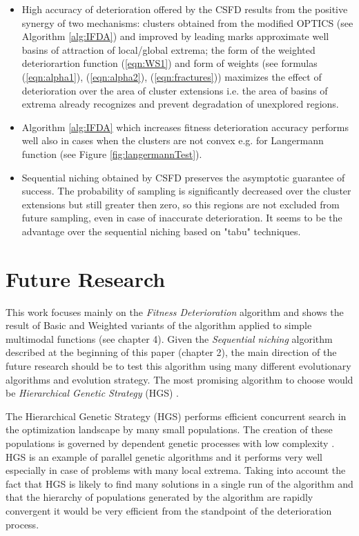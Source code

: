 \begin{itemize}
\item
High accuracy of deterioration offered by the CSFD results from
the positive synergy of two mechanisms:
clusters obtained from the modified OPTICS (see Algorithm \ref{alg:IFDA})
and improved by leading marks
approximate well basins of attraction of local/global extrema;
the form of the weighted deteriorartion function (\ref{eqn:WS1})
and form of weights (see formulas (\ref{eqn:alpha1}), (\ref{eqn:alpha2}), 
(\ref{eqn:fractures})) maximizes the effect of deterioration over the area of
cluster extensions i.e. the area of basins of extrema already recognizes
and prevent degradation of unexplored regions.



\item
Algorithm \ref{alg:IFDA} which increases 
fitness deterioration accuracy performs well also in cases when 
the clusters are not convex e.g. for Langermann function
(see Figure \ref{fig:langermannTest}).


\item
Sequential niching obtained by CSFD preserves 
the asymptotic guarantee of success.
The probability of sampling is significantly
decreased over the cluster extensions but still greater then zero, 
so this regions are not excluded from future sampling, even in case
of inaccurate deterioration.
It seems to be the advantage over the sequential niching 
based on "tabu" techniques.

\end{itemize}


\section{Future Research}

This work focuses mainly on the \textit{Fitness Deterioration} algorithm and
shows the result of Basic and Weighted variants of the algorithm applied to
simple multimodal functions (see chapter 4). Given the \textit{Sequential
niching} algorithm described at the beginning of this paper (chapter 2), the main
direction of the future research should be to test this algorithm using many 
different evolutionary algorithms and evolution strategy.
The most promising algorithm to choose would be \textit{Hierarchical Genetic
Strategy} (HGS) \cite{WierzbaSemczukKolodziejSchaefer2003}.

The Hierarchical Genetic Strategy (HGS) performs efficient concurrent
search in the optimization landscape by many small populations. The creation of
these populations is governed by dependent genetic processes with low complexity
\cite{WierzbaSemczukKolodziejSchaefer2003}. HGS is an example of parallel
genetic algorithms and it performs very well especially in case of problems with many local extrema.
Taking into account the fact that HGS is likely to find many solutions in a
single run of the algorithm and that the hierarchy of populations generated
by the algorithm are rapidly convergent it would be very efficient 
from the standpoint of the deterioration process.

